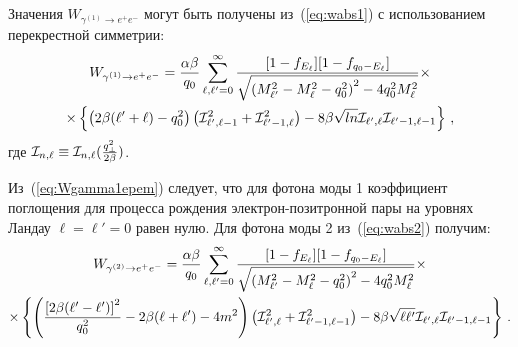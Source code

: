 Значения $W_{\gamma^{(1)} \to e^+ e^-}$ могут быть получены из~(\ref{eq:wabs1})
с использованием перекрестной симметрии:
\begin{equation}\label{eq:Wgamma1epem}
	\begin{gathered}
		W_{\gamma^{(1)}\to e^+e^-}= \frac{\alpha\beta }{q_0}\sum_{\ell, \ell'=0}^{\infty}\frac{[1-f_{E_{\ell}}][1-f_{q_0-E_\ell}]}{\sqrt{\left( M_{\ell'}^2-M_\ell^2-q_0^2\right)^2-4q_0^2 M_\ell^2}}\times
		\\
		\times \left\{\left(2\beta  ({\ell'}+\ell)-q_0^2\right)\left({\cal I}_{{\ell'},\ell-1}^2+{\cal I}_{{\ell'}-1,\ell}^2\right)-
		8 \beta  \sqrt{l n} {\cal I}_{{\ell'},\ell} {\cal I}_{{\ell'}-1,\ell-1}
		\right\}\, ,
	\end{gathered}
\end{equation}
где ${\cal I}_{n, \ell}\equiv{\cal I}_{n, \ell}(\frac{q_\perp^2}{2\beta})$.

\newpage
Из~(\ref{eq:Wgamma1epem}) следует, что для фотона моды 1 коэффициент поглощения для процесса рождения электрон-позитронной пары на уровнях Ландау $\ell=\ell'=0$ равен нулю. Для фотона моды 2 из~(\ref{eq:wabs2}) получим:
\begin{equation}
\begin{gathered}
W_{\gamma^{(2)}\to e^+e^-}= \frac{\alpha\beta }{q_0}\sum_{\ell, \ell'=0}^{\infty}\frac{[1-f_{E_\ell}][1-f_{q_0-E_\ell}]}{\sqrt{\left( M_{\ell'}^2-M_\ell^2-q_0^2\right)^2-4q_0^2 M_\ell^2}}\times
\\
\times \left\{\left(\frac{\left[2\beta  ({\ell'}-{\ell'})\right]^2}{q_0^2}-2 \beta  (\ell+{\ell'})-4m^2\right)\left({\cal I}_{{\ell'},\ell}^2+{\cal I}_{{\ell'}-1,\ell-1}^2\right)-
8 \beta  \sqrt{\ell {\ell'}} {\cal I}_{{\ell'},\ell} {\cal I}_{{\ell'}-1,\ell-1}
\right\}\, .
\end{gathered}
\end{equation}


